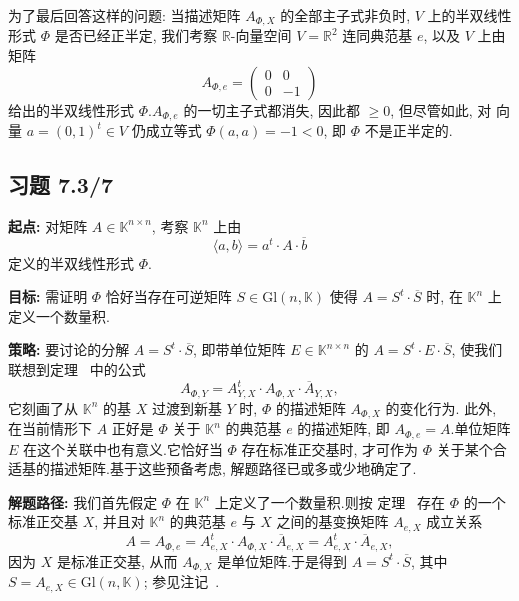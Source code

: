 为了最后回答这样的问题: 当描述矩阵 $A_{\varPhi, X}$ 的全部主子式非负时, $V$ 上的半双线性形式
$\varPhi$ 是否已经正半定, 我们考察 $\mathbb{R}$-向量空间 $V = \mathbb{R}^2$ 连同典范基 $e$, 以及 $V$
上由矩阵
\[
A_{\varPhi, e} = \begin{pmatrix} 0 & 0 \\ 0 & -1 \end{pmatrix}
\]
给出的半双线性形式 $\varPhi$.$A_{\varPhi, e}$ 的一切主子式都消失, 因此都 $\geq 0$, 但尽管如此, 对
向量 $a = (0, 1)^t \in V$ 仍成立等式 $\varPhi(a, a) = -1 < 0$, 即 $\varPhi$ 不是正半定的.

\subsection*{习题 7.3/7}

\noindent\textbf{起点:} 对矩阵 $A \in \mathbb{K}^{n \times n}$, 考察 $\mathbb{K}^n$ 上由
\[
\langle a, b \rangle = a^t \cdot A \cdot \overline{b}
\]
定义的半双线性形式 $\varPhi$.

\noindent\textbf{目标:} 需证明 $\varPhi$ 恰好当存在可逆矩阵 $S \in \mathrm{Gl}(n, \mathbb{K})$ 使得
$A = S^t \cdot \overline{S}$ 时, 在 $\mathbb{K}^n$ 上定义一个数量积.

\noindent\textbf{策略:} 要讨论的分解 $A = S^t \cdot \overline{S}$, 即带单位矩阵
$E \in \mathbb{K}^{n \times n}$ 的 $A = S^t \cdot E \cdot \overline{S}$, 使我们联想到定理~
中的公式
\[
A_{\varPhi, Y} = A_{Y, X}^t \cdot A_{\varPhi, X} \cdot \overline{A}_{Y, X},
\]
它刻画了从 $\mathbb{K}^n$ 的基 $X$ 过渡到新基 $Y$ 时, $\varPhi$ 的描述矩阵 $A_{\varPhi, X}$ 的变化行为.
此外, 在当前情形下 $A$ 正好是 $\varPhi$ 关于 $\mathbb{K}^n$ 的典范基 $e$ 的描述矩阵, 即
$A_{\varPhi, e} = A$.单位矩阵 $E$ 在这个关联中也有意义.它恰好当 $\varPhi$ 存在标准正交基时, 才可作为
$\varPhi$ 关于某个合适基的描述矩阵.基于这些预备考虑, 解题路径已或多或少地确定了.

\noindent\textbf{解题路径:} 我们首先假定 $\varPhi$ 在 $\mathbb{K}^n$ 上定义了一个数量积.则按
定理~ 存在 $\varPhi$ 的一个标准正交基 $X$, 并且对 $\mathbb{K}^n$ 的典范基 $e$ 与 $X$
之间的基变换矩阵 $A_{e, X}$ 成立关系
\[
A = A_{\varPhi, e} = A_{e, X}^t \cdot A_{\varPhi, X} \cdot \overline{A}_{e, X} = A_{e, X}^t \cdot \overline{A}_{e, X},
\]
因为 $X$ 是标准正交基, 从而 $A_{\varPhi, X}$ 是单位矩阵.于是得到 $A = S^t \cdot \overline{S}$, 其中
$S = A_{e, X} \in \mathrm{Gl}(n, \mathbb{K})$; 参见注记~.

